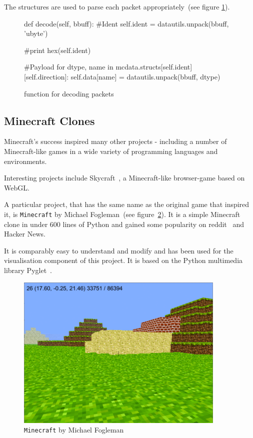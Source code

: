 The structures are used to parse each packet appropriately~(see figure \ref{snippet_parse}).

		\begin{figure}[ht]
			\centering
			\begin{minipage}{13cm}
				\begin{pseudocode}
	def decode(self, bbuff):
		#Ident
		self.ident = datautils.unpack(bbuff, 'ubyte')
		
		#print hex(self.ident)
		
		#Payload
		for dtype, name in mcdata.structs[self.ident][self.direction]:
			self.data[name] = datautils.unpack(bbuff, dtype)
					\end{pseudocode}
				\caption{function for decoding packets}
				\label{snippet_parse}
			\end{minipage}
		\end{figure}
		
		\subsection{Minecraft Clones}

Minecraft's success inspired many other projects - including a number of Minecraft-like games in a wide variety of programming languages and environments.

Interesting projects include Skycraft~\cite{skycraft}, a Minecraft-like browser-game based on WebGL.

A particular project, that has the same name as the original game that inspired it, is \texttt{Minecraft} by Michael Fogleman~(see figure~\ref{fogleman_mc_screen}). It is a simple Minecraft clone in under 600 lines of Python and gained some popularity on reddit~\cite{fogle-reddit} and Hacker News.~\cite{fogle_hn}

It is comparably easy to understand and modify and has been used for the visualisation component of this project. It is based on the Python multimedia library Pyglet~\cite{pyglet}.

\begin{figure}[h]
  \centering
    \includegraphics[width=10cm]{graphics/fogleman_mc_screen}
  \caption{\texttt{Minecraft} by Michael Fogleman}
  \label{fogleman_mc_screen}
\end{figure}

